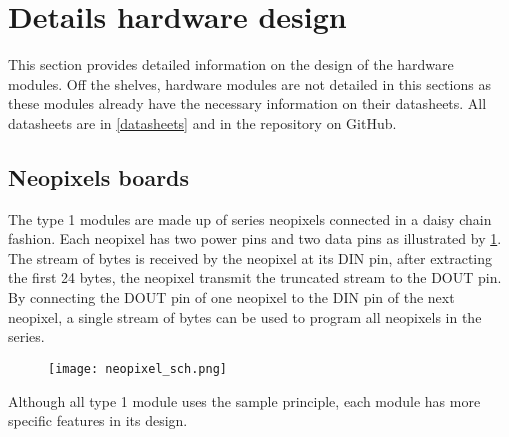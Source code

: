 \section{Details hardware design} \label{design}
This section provides detailed information on the design of the hardware modules. Off the shelves, hardware modules are not detailed in this sections as these modules already have the necessary information on their datasheets. All datasheets are in \ref{datasheets} and in the repository on GitHub. 

\subsection{Neopixels boards}
The type 1 modules are made up of series neopixels connected in a daisy chain fashion. Each neopixel has two power pins and two data pins as illustrated by \cref{fig:neopixel_sch}. The stream of bytes is received by the neopixel at its DIN pin, after extracting the first 24 bytes, the neopixel transmit the truncated stream to the DOUT pin. By connecting the DOUT pin of one neopixel to the DIN pin of the next neopixel, a single stream of bytes can be used to program all neopixels in the series. 
\begin{figure}[ht]
\centering
\texttt{[image: neopixel\_sch.png]}
\caption{}
\label{fig:neopixel_sch}
\end{figure}
Although all type 1 module uses the sample principle, each module has more specific features in its design.

